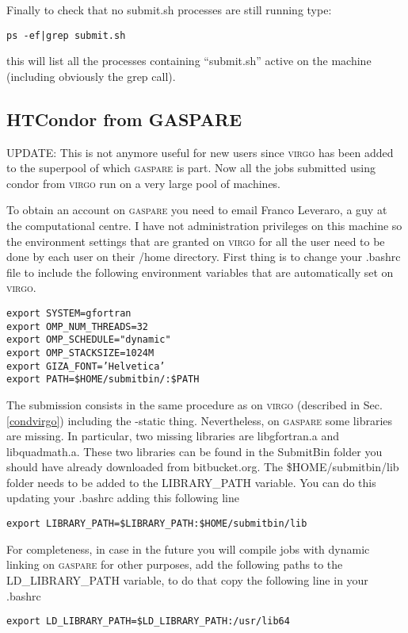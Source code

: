 \documentclass[10pt,a4paper,twoside]{article} %
\begin{document}
Finally to check that no submit.sh processes are still running type:
\begin{verbatim}
ps -ef|grep submit.sh
\end{verbatim}
this will list all the processes containing ``submit.sh'' active on the machine (including obviously the grep call).

\subsection{HTCondor from GASPARE}

UPDATE: This is not anymore useful for new users since \textsc{virgo} has been added to the superpool of which \textsc{gaspare} is part. Now all the jobs submitted using condor from \textsc{virgo} run on a very large pool of machines.

To obtain an account on \textsc{gaspare} you need to email Franco Leveraro, a guy at the computational centre.
I have not administration privileges on this machine so the environment settings that are granted on \textsc{virgo} for all the user need to be done by each user on their /home directory. First thing is to change your .bashrc file to include the following environment variables that are automatically set on \textsc{virgo}. 
\begin{verbatim}
export SYSTEM=gfortran
export OMP_NUM_THREADS=32
export OMP_SCHEDULE="dynamic"
export OMP_STACKSIZE=1024M
export GIZA_FONT=’Helvetica’
export PATH=$HOME/submitbin/:$PATH
\end{verbatim}

The submission consists in the same procedure as on \textsc{virgo} (described in Sec. \ref{condvirgo}) including the -static thing. Nevertheless, on \textsc{gaspare} some libraries are missing. In particular, two missing libraries are libgfortran.a and libquadmath.a. These two libraries can be found in the SubmitBin folder you should have already downloaded from bitbucket.org. The \$HOME/submitbin/lib folder needs to be added to the LIBRARY\_PATH variable. You can do this updating your .bashrc adding this following line
\begin{verbatim}
export LIBRARY_PATH=$LIBRARY_PATH:$HOME/submitbin/lib
\end{verbatim}
For completeness, in case in the future you will compile jobs with dynamic linking on \textsc{gaspare} for other purposes, add the following paths to the LD\_LIBRARY\_PATH variable, to do that copy the following line in your .bashrc 
\begin{verbatim}
export LD_LIBRARY_PATH=$LD_LIBRARY_PATH:/usr/lib64
\end{verbatim}
\end{document}
